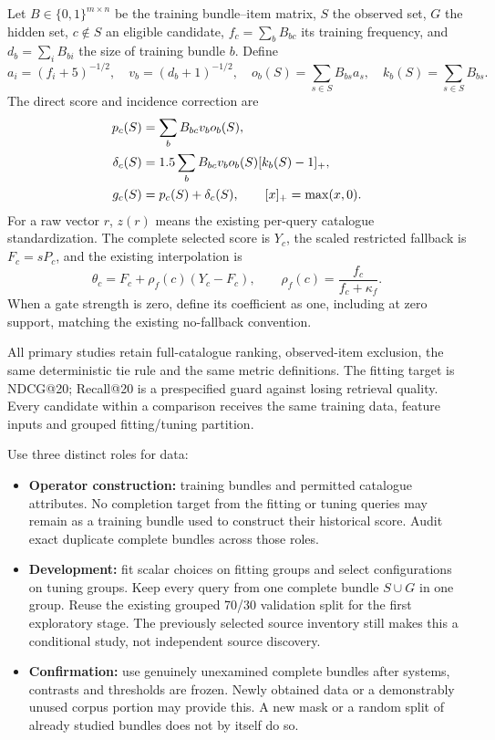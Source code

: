 \documentclass[11pt,a4paper]{article}
\begin{document}
Let $B\in\{0,1\}^{m\times n}$ be the training bundle--item matrix, $S$
the observed set, $G$ the hidden set, $c\notin S$ an eligible candidate,
$f_c=\sum_bB_{bc}$ its training frequency, and $d_b=\sum_iB_{bi}$ the
size of training bundle $b$. Define
\begin{equation}
 a_i=(f_i+5)^{-1/2},\quad v_b=(d_b+1)^{-1/2},\quad
 o_b(S)=\sum_{s\in S}B_{bs}a_s,\quad k_b(S)=\sum_{s\in S}B_{bs}.
\end{equation}
The direct score and incidence correction are
\begin{align}
 p_c(S)&=\sum_bB_{bc}v_b o_b(S),\notag\\
 \delta_c(S)&=1.5\sum_bB_{bc}v_b o_b(S)[k_b(S)-1]_+,\notag\\
 g_c(S)&=p_c(S)+\delta_c(S),\qquad [x]_+=\max(x,0).
 \label{eq:history}
\end{align}
For a raw vector $r$, $z(r)$ means the existing per-query catalogue
standardization. The complete selected score is $Y_c$, the scaled restricted
fallback is $F_c=sP_c$, and the existing interpolation is
\begin{equation}
 \theta_c=F_c+\rho_f(c)(Y_c-F_c),\qquad
 \rho_f(c)=\frac{f_c}{f_c+\kappa_f}.
 \label{eq:gate}
\end{equation}
When a gate strength is zero, define its coefficient as one, including at
zero support, matching the existing no-fallback convention.

All primary studies retain full-catalogue ranking, observed-item exclusion,
the same deterministic tie rule and the same metric definitions. The
fitting target is NDCG@20; Recall@20 is a prespecified guard against losing
retrieval quality. Every candidate within a comparison receives the same
training data, feature inputs and grouped fitting/tuning partition.

Use three distinct roles for data:
\begin{itemize}
\item \textbf{Operator construction:} training bundles and permitted
catalogue attributes. No completion target from the fitting or tuning queries
may remain as a training bundle used to construct their historical score.
Audit exact duplicate complete bundles across those roles.
\item \textbf{Development:} fit scalar choices on fitting groups and select
configurations on tuning groups. Keep every query from one complete bundle
$S\cup G$ in one group. Reuse the existing grouped 70/30 validation split
for the first exploratory stage. The previously selected source inventory
still makes this a conditional study, not independent source discovery.
\item \textbf{Confirmation:} use genuinely unexamined complete bundles
after systems, contrasts and thresholds are frozen. Newly obtained data or
a demonstrably unused corpus portion may provide this. A new mask or a
random split of already studied bundles does not by itself do so.
\end{itemize}
\end{document}
